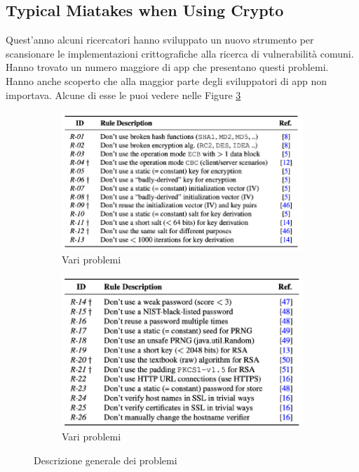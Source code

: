 \documentclass[11pt]{article}
\theoremstyle{definition} \newtheorem{definizione}{Definizione}[section] %
\begin{document}
    \subsection{Typical Miatakes when Using Crypto}
    Quest'anno alcuni ricercatori hanno sviluppato un nuovo strumento per scansionare le implementazioni crittografiche alla ricerca di vulnerabilità comuni.
    Hanno trovato un numero maggiore di app che presentano questi problemi.
    Hanno anche scoperto che alla maggior parte degli sviluppatori di app non importava.
    Alcune di esse le puoi vedere nelle Figure \ref{fig:figure_general}
    \begin{figure}[H]
        \centering
      
        \begin{subfigure}{0.48\textwidth}
          \centering
          \includegraphics[width=\textwidth]{3.png}
          \caption{Vari problemi}
          \label{fig:figura3}
        \end{subfigure}
        \hfill
        \begin{subfigure}{0.48\textwidth}
          \centering
          \includegraphics[width=\textwidth]{4.png}
          \caption{Vari problemi}
          \label{fig:figura4}
        \end{subfigure}
      
        \caption{Descrizione generale dei problemi}
        \label{fig:figure_general}
      
      \end{figure}
    
\end{document}
